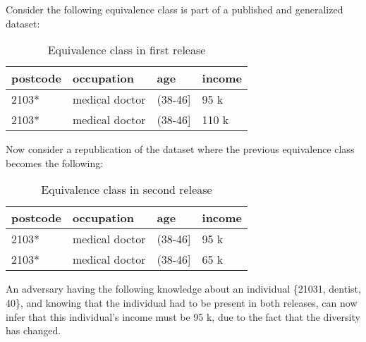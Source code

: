 \begin{example}
Consider the following equivalence class is part of a published and generalized dataset:
\begin{table}[H]
\centering
\begin{tabular}{llll}
\toprule
postcode & occupation     & age       & income \\ \midrule
2103*    & medical doctor & (38-46{]} & 95 k   \\
2103*    & medical doctor & (38-46{]} & 110 k  \\ \bottomrule
\end{tabular}
\caption{Equivalence class in first release}
\label{ecRelease1}
\end{table}
Now consider a republication of the dataset where the previous equivalence class becomes the following:
\begin{table}[H]
\centering
\begin{tabular}{llll}
\toprule
postcode & occupation     & age       & income \\ \midrule
2103*    & medical doctor & (38-46{]} & 95 k   \\
2103*    & medical doctor & (38-46{]} & 65 k  \\ \bottomrule
\end{tabular}
\caption{Equivalence class in second release}
\label{ecRelease2}
\end{table}
An adversary having the following knowledge about an individual \{21031, dentist, 40\}, and knowing that the individual had to be present in both releases, can now infer that this individual's income must be 95 k, due to the fact that the diversity has changed.
\end{example}

